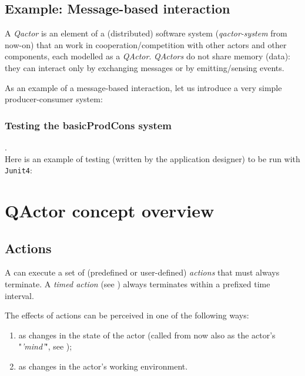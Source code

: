 \subsection{Example: Message-based interaction}

A \textit{Qactor} is an element of a (distributed) software system (\textit{qactor-system} from now-on) that an work in cooperation/competition with other actors and other components, each modelled as a \textit{QActor}. \textit{QActors} do not share memory (data): they can interact only by exchanging messages or by emitting/sensing events.

As an example of a message-based interaction, let us introduce a very simple producer-consumer system:



\subsubsection{Testing the basicProdCons system}.\\
Here is an example of testing (written by the application designer) to be run with \texttt{Junit4}:



\newpage 
\section{QActor concept overview}


\subsection{Actions }
A \qa{} can execute a set of (predefined or user-defined) \textit{actions} that must always terminate.
A \textit{timed action} (see ) always terminates within a prefixed time interval.

The effects of actions can be perceived in one of the following ways:

\begin{enumerate}
 \item  as changes in the state of the actor (called from now also as the actor's "\textit{'mind'}", see );
 \item  as changes in the actor's working environment.
\end{enumerate}  

